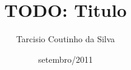 \documentclass[pt,bsc,oneside,onehalfspacing]{risethesis}
\title{TODO: Titulo}
\date{setembro/2011}
\author{Tarcisio Coutinho da Silva}
\begin{document}
\frontmatter
\frontpage
\presentationpage

\mainmatter
\tableofcontents

\end{document}
